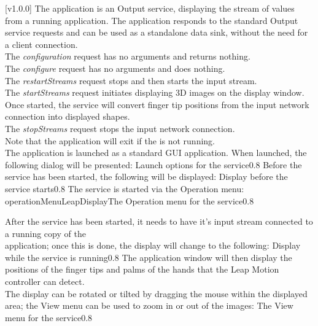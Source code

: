 [v1.0.0]
The  application is an Output service, displaying the
stream of values from a running  application.
The application responds to the standard Output service requests and can be used as a
standalone data sink, without the need for a client connection.\\

The \emph{configuration} request has no arguments and returns nothing.\\

The \emph{configure} request has no arguments and does nothing.\\

The \emph{restartStreams} request stops and then starts the input stream.\\

The \emph{startStreams} request initiates displaying 3D images on the display window.
Once started, the service will convert finger tip positions from the input \yarp{} network
connection into displayed shapes.\\

The \emph{stopStreams} request stops the input \yarp{} network connection.\\ 

Note that the application will exit if the \emph{\RS} is not running.\\

The  application is launched as a standard GUI
application.
When launched, the following dialog will be presented:
%
{Launch options for the \emph{\LDO} service}{0.8}
\condPage{}
Before the service has been started, the following will be displayed:
%
{Display before the \emph{\LDO} service starts}{0.8}
\condPage{}
The service is started via the Operation menu:
%
{operationMenuLeapDisplay}{The Operation menu for the \emph{\LDO} service}{0.8}

After the service has been started, it needs to have it's input stream connected to a
running copy of the\\
 application;
once this is done, the display will change to the following:
%
{Display while the \emph{\LDO} service is running}{0.8}
\condPage{}
The  application window will then display the
positions of the finger tips and palms of the hands that the Leap Motion controller can
detect.\\

The display can be rotated or tilted by dragging the mouse within the displayed area;
the View menu can be used to zoom in or out of the images:
%
{The View menu for the \emph{\LDO} service}{0.8}
\primaryEnd{}
